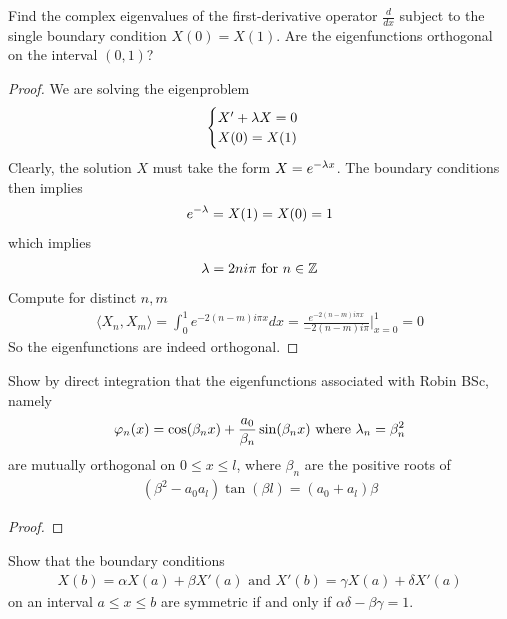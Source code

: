\documentclass{report}
\begin{document}
\begin{question}{}{}
Find the complex eigenvalues of the first-derivative operator $\frac{d}{dx}$ subject to the single boundary condition $X(0)=X(1)$. Are the eigenfunctions orthogonal on the interval $(0,1)$? 
\end{question}
\begin{proof}
We are solving the eigenproblem 
\begin{align*}
\begin{cases}
  X'+ \lambda X=0 \\
  X(0)=X(1)
\end{cases}
\end{align*}
Clearly, the solution $X$ must take the form  $X=e^{-\lambda x}$. The boundary conditions then implies 
\begin{align*}
e^{-\lambda }=X(1)=X(0)=1
\end{align*}
which implies 
\begin{align*}
\lambda = 2n i \pi \text{ for }n\in\mathbb{Z}
\end{align*}
Compute for distinct $n,m$ 
\begin{align*}
\langle X_n,X_m\rangle = \int_0^1 e^{- 2(n-m) i \pi  x}dx= \frac{e^{-2(n-m)i \pi  x}}{-2(n-m)i \pi }\Big|_{x=0}^1= 0
\end{align*}
So the eigenfunctions are indeed orthogonal. 
\end{proof}
\begin{question}{}{}
Show by direct integration that the eigenfunctions associated with Robin BSc, namely 
\begin{align*}
\varphi_n (x)= \cos (\beta_n x)+ \frac{a_0}{\beta_n} \sin (\beta_n x)\text{ where }\lambda _n= \beta_n^2
\end{align*}
are mutually orthogonal on $0\leq x\leq l$, where $\beta _n$ are the positive roots of 
\begin{align*}
  (\beta ^2 - a_0a_l)\tan (\beta l)= (a_0+a_l)\beta 
\end{align*}
\end{question}
\begin{proof}

\end{proof}
\begin{question}{}{}
Show that the boundary conditions 
\begin{align*}
X(b)=\alpha X(a)+\beta X'(a)\text{ and }X'(b)=\gamma  X(a)+\delta X'(a)
\end{align*}
on an interval $a\leq x\leq b$ are symmetric if and only if $\alpha  \delta-\beta  \gamma =1$.
\end{question}
\end{document}
